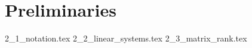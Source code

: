 \chapter{Preliminaries}
\label{chap:preliminaries}

{2_1_notation.tex}
{2_2_linear_systems.tex}
{2_3_matrix_rank.tex}